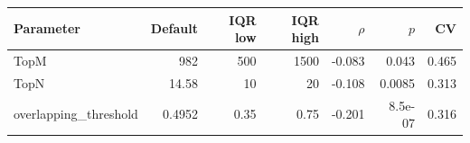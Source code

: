 \begin{tabular}{lrrrrrr}
\hline
Parameter & Default & IQR low & IQR high & $\rho$ & $p$ & CV \\
\hline
TopM & 982 & 500 & 1500 & -0.083 & 0.043 & 0.465 \\
TopN & 14.58 & 10 & 20 & -0.108 & 0.0085 & 0.313 \\
overlapping_threshold & 0.4952 & 0.35 & 0.75 & -0.201 & 8.5e-07 & 0.316 \\
\hline
\end{tabular}
